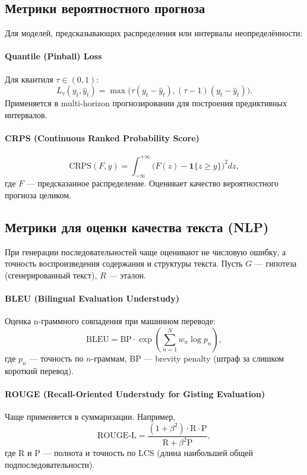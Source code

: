 \documentclass[12pt,a4paper]{article}
\begin{document}
\subsection{Метрики вероятностного прогноза}

Для моделей, предсказывающих распределения или интервалы неопределённости:

\paragraph{Quantile (Pinball) Loss}
Для квантиля $\tau \in (0,1)$:
\[
L_\tau (y_t, \hat y_t) =
\max\bigl(\tau (y_t - \hat y_t),(\tau-1)(y_t - \hat y_t)\bigr).
\]
Применяется в multi-horizon прогнозировании для построения предиктивных интервалов.

\paragraph{CRPS (Continuous Ranked Probability Score)}
\[
\mathrm{CRPS}(F, y) =
\int_{-\infty}^{+\infty}
\bigl(F(z) - \mathbf{1}\{z \ge y\}\bigr)^2 dz,
\]
где $F$ — предсказанное распределение. Оценивает качество вероятностного прогноза целиком.

\subsection{Метрики для оценки качества текста (NLP)}

При генерации последовательностей чаще оценивают не числовую ошибку, а точность воспроизведения содержания и структуры текста. Пусть $G$ — гипотеза (сгенерированный текст), $R$ — эталон.

\paragraph{BLEU (Bilingual Evaluation Understudy)}
Оценка n-граммного совпадения при машинном переводе:
\[
\mathrm{BLEU} =
\mathrm{BP}
\cdot
\exp\!\left(\sum_{n=1}^{N} w_n \log p_n\right),
\]
где $p_n$ — точность по $n$-граммам, $\mathrm{BP}$ — brevity penalty (штраф за слишком короткий перевод).

\paragraph{ROUGE (Recall-Oriented Understudy for Gisting Evaluation)}
Чаще применяется в суммаризации. Например,
\[
\mathrm{ROUGE\text{-}L} =
\frac{(1+\beta^2)\cdot \mathrm{R}\cdot \mathrm{P}}
{\mathrm{R} + \beta^2 \mathrm{P}},
\]
где $\mathrm{R}$ и $\mathrm{P}$ — полнота и точность по LCS (длина наибольшей общей подпоследовательности).
\end{document}
